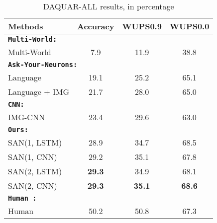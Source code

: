 \documentclass[10pt,twocolumn,letterpaper]{article}
\begin{document}
\begin{table}[!thbp]
  \vspace{-0.5cm}
\centering
  \begin{tabular}{l  c  c  c }
    \toprule
    Methods & Accuracy & WUPS0.9 &  WUPS0.0
    \\
    \midrule
    \multicolumn{4}{l}{
    {\bf \texttt{Multi-World:}} \cite{malinowski2014multi}} \\
    Multi-World & 7.9 & 11.9 & 38.8 \\
    \midrule
    \multicolumn{4}{l}{
    {\bf \texttt{Ask-Your-Neurons:}} \cite{malinowski2015ask}} \\
    Language & 19.1 & 25.2 & 65.1 \\
    Language + IMG & 21.7 & 28.0 & 65.0 \\
    {\bf \texttt{CNN:}} \cite{ma2015learning} \\
    IMG-CNN & 23.4 & 29.6 & 63.0 \\
    \midrule
    {\bf \texttt{Ours:}} \\
    SAN(1, LSTM) & 28.9  & 34.7 & 68.5 \\
    SAN(1, CNN) & 29.2 & 35.1 & 67.8 \\
    SAN(2, LSTM) & {\bf 29.3} & 34.9 & 68.1 \\
    SAN(2, CNN) & {\bf 29.3} & {\bf 35.1} & {\bf 68.6} \\
    \midrule
    {\bf \texttt{Human :}\cite{malinowski2014multi}} \\
    Human & 50.2 & 50.8 & 67.3 \\
    \bottomrule
  \end{tabular}
  \caption{DAQUAR-ALL results, in percentage}
  \label{tab:daquar_all_results}
\end{table}
\end{document}
